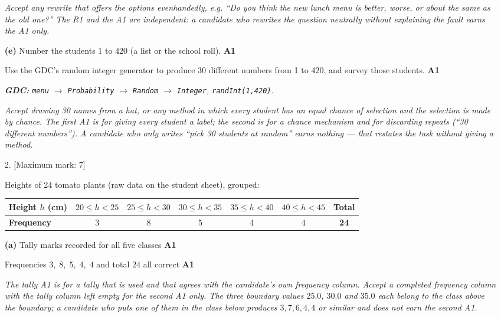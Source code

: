 \documentclass[12pt, twoside]{article}
\begin{document}
\begin{enumerate}[itemsep=0.3cm]
\emph{Accept any rewrite that offers the options evenhandedly, e.g.
``Do you think the new lunch menu is better, worse, or about the same as
the old one?'' The R1 and the A1 are independent: a candidate who
rewrites the question neutrally without explaining the fault earns the
A1 only.}

\textbf{(e)} Number the students $1$ to $420$ (a list or the school
roll). \hfill \textbf{A1}

Use the GDC's random integer generator to produce 30 different numbers
from 1 to 420, and survey those students. \hfill \textbf{A1}

\emph{\textbf{GDC:} \texttt{menu} $\rightarrow$ \texttt{Probability}
$\rightarrow$ \texttt{Random} $\rightarrow$ \texttt{Integer},
\texttt{randInt(1,420)}.}

\emph{Accept drawing 30 names from a hat, or any method in which every
student has an equal chance of selection and the selection is made by
chance. The first A1 is for giving every student a label; the second is
for a chance mechanism \emph{and} for discarding repeats (``30 different
numbers''). A candidate who only writes ``pick 30 students at random''
earns nothing --- that restates the task without giving a method.}

\newpage

\item[2.] [Maximum mark: 7]

Heights of 24 tomato plants (raw data on the student sheet), grouped:

{\renewcommand{\arraystretch}{1.3}
\begin{center}
\begin{tabular}{|l|c|c|c|c|c|c|}
\hline
\textbf{Height $h$ (cm)} & $20 \le h < 25$ & $25 \le h < 30$ &
$30 \le h < 35$ & $35 \le h < 40$ & $40 \le h < 45$ & \textbf{Total} \\ \hline
\textbf{Frequency} & 3 & 8 & 5 & 4 & 4 & \textbf{24} \\ \hline
\end{tabular}
\end{center}}

\textbf{(a)} Tally marks recorded for all five classes
\hfill \textbf{A1}

Frequencies $3,\; 8,\; 5,\; 4,\; 4$ and total $24$ all correct
\hfill \textbf{A1}

\emph{The tally A1 is for a tally that is used and that agrees with the
candidate's own frequency column. Accept a completed frequency column
with the tally column left empty for the second A1 only. The three
boundary values $25.0$, $30.0$ and $35.0$
each belong to the class \emph{above} the boundary; a candidate who puts
one of them in the class below produces $3,7,6,4,4$ or similar and does
not earn the second A1.}


\end{enumerate}
\end{document}
